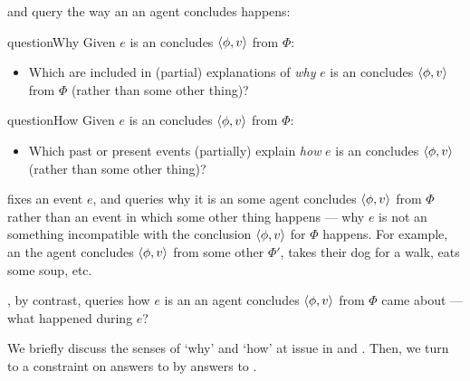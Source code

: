 \begin{note}
  \qWhy{} and \qHow{} query the way an  an agent concludes happens:

  \begin{question}{questionWhy}{\qWhy{}}
    Given \(e\) is an  \vAgent{} concludes \(\langle\phi, v\rangle\) from \(\Phi\):
    \begin{itemize}
    \item
      Which  are included in (partial) explanations of \emph{why} \(e\) is an  \vAgent{} concludes \(\langle\phi, v\rangle\) from \(\Phi\) (rather than some other thing)?
    \end{itemize}
    \vspace{-1\baselineskip}
  \end{question}

  \begin{question}{questionHow}{\qHow{}}
    \label{q:how}
    Given \(e\) is an  \vAgent{} concludes \(\langle\phi, v\rangle\) from \(\Phi\):
    \begin{itemize}
    \item
      Which past or present events (partially) explain \emph{how} \(e\) is an  \vAgent{} concludes \(\langle\phi, v\rangle\) (rather than some other thing)?
    \end{itemize}
    \vspace{-1.5\baselineskip}
  \end{question}
\end{note}


\begin{note}
  \qWhy{} fixes an event \(e\), and queries why it is an  some agent concludes \(\langle\phi, v\rangle\) from \(\Phi\) rather than an event in which some other thing happens --- why \(e\) is not an  something incompatible with the conclusion \(\langle\phi, v\rangle\) for \(\Phi\) happens.
  For example, an  the agent concludes \(\langle\phi, v\rangle\) from some other \pool{} \(\Phi'\), takes their dog for a walk, eats some soup, etc.

  \qHow{}, by contrast, queries how \(e\) is an  an agent concludes \(\langle\phi, v\rangle\) from \(\Phi\) came about --- what happened during \(e\)?
\end{note}

\begin{note}
  We briefly discuss the senses of `why' and `how' at issue in \qWhy{} and \qHow{}.
  Then, we turn to a constraint on answers to \qWhy{} by answers to \qHow{}.
\end{note}


